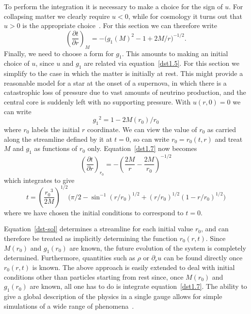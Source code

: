 \documentclass[a4paper]{article}
\numberwithin{equation}{section}
\newcommand{\dr}{\partial_r}
\newcommand{\deriv}[2]{\frac{\partial #1}{\partial #2}}
\begin{document}
To perform the integration it is necessary to make a choice for the
sign of $u$.  For collapsing matter we clearly require $u<0$, while
for cosmology it turns out that $u>0$ is the appropriate
choice~\cite{DDGHL-I}.  For this section we can therefore write
%
\begin{equation}
\left( \deriv{t}{r} \right)_{\!M} = -\bigl( g_1(M)^2 - 1 + 2M/r
\bigr)^{-1/2}.
\label{dst1.7} 
\end{equation}
%
Finally, we need to choose a form for $g_1$.  This amounts to making
an initial choice of $u$, since $u$ and $g_1$ are related via
equation~\eqref{dst1.5}.  For this section we simplify to the case in
which the matter is initially at rest.  This might provide a
reasonable model for a star at the onset of a supernova, in which
there is a catastrophic loss of pressure due to vast amounts of
neutrino production, and the central core is suddenly left with no
supporting pressure.  With $u(r,0)=0$ we can write
%
\begin{equation}
{g_1}^2 = 1 - 2M(r_0)/r_0
\end{equation} 
%
where $r_0$ labels the initial $r$ coordinate.  We can view the value
of $r_0$ as carried along the streamline defined by it at $t=0$, so
can write $r_0=r_0(t,r)$ and treat $M$ and $g_1$ as functions of $r_0$
only.  Equation~\eqref{dst1.7} now becomes
%
\begin{equation}
\left( \deriv{t}{r} \right)_{\!r_0} = -\left( \frac{2M}{r} -
\frac{2M}{r_0} \right)^{-1/2}
\end{equation}
%
which integrates to give
%
\begin{equation}
t = \left( \frac{{r_0}^3}{2M} \right)^{1/2} \bigl( \pi/2 -
\sin^{-1}(r/r_0)^{1/2} + (r/r_0)^{1/2} (1-r/r_0)^{1/2} \bigr)
\label{dst-sol}
\end{equation}
%
where we have chosen the initial conditions to correspond to $t=0$.


Equation~\eqref{dst-sol} determines a streamline for each initial value
$r_0$, and can therefore be treated as implicitly determining the
function $r_0(r,t)$.  Since $M(r_0)$ and $g_1(r_0)$ are known, the
future evolution of the system is completely determined.  Furthermore,
quantities such as $\rho$ or $\dr u$ can be found directly once
$r_0(r,t)$ is known.  The above approach is easily extended to deal
with initial conditions other than particles starting from rest
since, once $M(r_0)$ and $g_1(r_0)$ are known, all one has to do is
integrate equation~\eqref{dst1.7}.  The ability to give a global
description of the physics in a single gauge allows for simple
simulations of a wide range of phenomena~\cite{DDGHL-I}.
\end{document}
